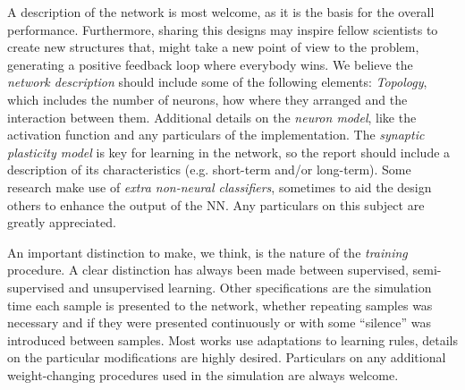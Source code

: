 A description of the network is most welcome, as it is the basis for the overall performance. Furthermore, sharing this designs may inspire fellow scientists to create new structures that, might take a new point of view to the problem, generating a positive feedback loop where everybody wins. We believe the \emph{network description} should include some of the following elements:
    \textit{Topology}, %
    which includes the number of neurons, how where they arranged and the interaction between them. 
    Additional details on the \textit{neuron model}, %
    like the activation function and any particulars of the implementation.
    The \textit{synaptic plasticity model} %
    is key for learning in the network, so the report should include a description of its characteristics (e.g. short-term and/or long-term).
      Some research make use of \emph{extra non-neural classifiers}, sometimes to aid the design others to enhance the output of the NN. Any particulars on this subject are greatly appreciated.


An important distinction to make, we think, is the nature of the \emph{training} procedure. A clear distinction has always been made between supervised, semi-supervised and unsupervised learning. Other specifications are the simulation time each sample is presented to the network, whether repeating samples was necessary and if they were presented continuously or with some ``silence'' was introduced between samples. Most works use adaptations to learning rules, details on the particular modifications are highly desired. Particulars on any additional weight-changing procedures used in the simulation are always welcome.

